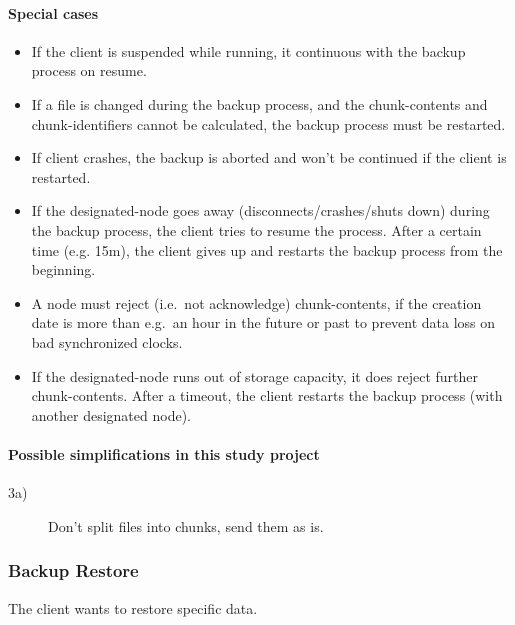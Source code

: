 \paragraph{Special cases}
\begin{itemize}
    \item If the \gls{client} is suspended while running, it continuous with the backup process on resume. %
    \item If a \gls{file} is changed during the backup process, and the \glspl{chunk-content} and \glspl{chunk-identifier} cannot be calculated, the backup process must be restarted. %
    \item If \gls{client} crashes, the backup is aborted and won't be continued if the \gls{client} is restarted.
    \item If the \gls{designated-node} goes away (disconnects/crashes/shuts down) during the backup process, the \gls{client} tries to resume the process. After a certain time (e.g. 15m), the \gls{client} gives up and restarts the backup process from the beginning.
    \item A \gls{node} must reject (i.e.\ not acknowledge) \glspl{chunk-content}, if the creation date is more than e.g.\ an hour in the future or past to prevent data loss on bad synchronized clocks.
    \item If the \gls{designated-node} runs out of storage capacity, it does reject further \glspl{chunk-content}. After a timeout, the client restarts the backup process (with another designated node).
\end{itemize}

\paragraph{Possible simplifications in this study project}
\begin{description}
    \item[3a)] Don't split files into chunks, send them as is.
\end{description}

\subsubsection{Backup Restore}\label{sec:scenario-backup-restore}
The client wants to restore specific data.

